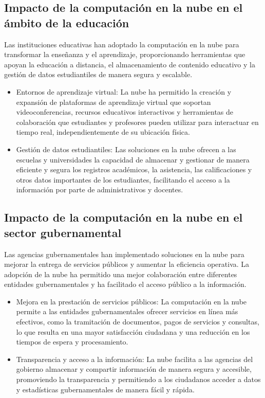 {        \subsection[Impacto en la educaci{\'o}n]{Impacto de la computaci{\'o}n en la nube en el {\'a}mbito de la educaci{\'o}n}
            Las instituciones educativas han adoptado la computaci{\'o}n en la nube para transformar la enseñanza y el aprendizaje, proporcionando herramientas que apoyan la educaci{\'o}n a distancia, el almacenamiento de contenido educativo y la gesti{\'o}n de datos estudiantiles de manera segura y escalable.
            
            \begin{itemize}
                \item Entornos de aprendizaje virtual: La nube ha permitido la creaci{\'o}n y expansi{\'o}n de plataformas de aprendizaje virtual que soportan videoconferencias, recursos educativos interactivos y herramientas de colaboraci{\'o}n que estudiantes y profesores pueden utilizar para interactuar en tiempo real, independientemente de su ubicaci{\'o}n f{\'i}sica.
                \item Gesti{\'o}n de datos estudiantiles: Las soluciones en la nube ofrecen a las escuelas y universidades la capacidad de almacenar y gestionar de manera eficiente y segura los registros acad{\'e}micos, la asistencia, las calificaciones y otros datos importantes de los estudiantes, facilitando el acceso a la informaci{\'o}n por parte de administrativos y docentes.
            \end{itemize}
        \subsection[Impacto en el sector gubernamental]{Impacto de la computaci{\'o}n en la nube en el sector gubernamental}
            Las agencias gubernamentales han implementado soluciones en la nube para mejorar la entrega de servicios p{\'u}blicos y aumentar la eficiencia operativa. La adopci{\'o}n de la nube ha permitido una mejor colaboraci{\'o}n entre diferentes entidades gubernamentales y ha facilitado el acceso p{\'u}blico a la informaci{\'o}n.

            \begin{itemize}
                \item Mejora en la prestaci{\'o}n de servicios p{\'u}blicos: La computaci{\'o}n en la nube permite a las entidades gubernamentales ofrecer servicios en l{\'i}nea m{\'a}s efectivos, como la tramitaci{\'o}n de documentos, pagos de servicios y consultas, lo que resulta en una mayor satisfacci{\'o}n ciudadana y una reducci{\'o}n en los tiempos de espera y procesamiento.
                \item Transparencia y acceso a la informaci{\'o}n: La nube facilita a las agencias del gobierno almacenar y compartir informaci{\'o}n de manera segura y accesible, promoviendo la transparencia y permitiendo a los ciudadanos acceder a datos y estad{\'i}sticas gubernamentales de manera f{\'a}cil y r{\'a}pida.
            \end{itemize}        
}
